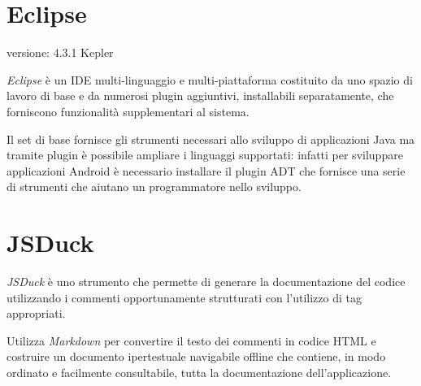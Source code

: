 \section{Eclipse}
\begin{description}
\item[versione: 4.3.1 Kepler]
\end{description}

\emph{Eclipse} è un \ac{IDE} multi-linguaggio e multi-piattaforma costituito da uno spazio di lavoro di base e da numerosi plugin aggiuntivi, installabili separatamente, che forniscono funzionalità supplementari al sistema.

Il set di base fornisce gli strumenti necessari allo sviluppo di applicazioni Java ma tramite plugin è possibile ampliare i linguaggi supportati: infatti per sviluppare applicazioni Android è necessario installare il plugin \ac{ADT} che fornisce una serie di strumenti che aiutano un programmatore nello sviluppo.

\section{JSDuck}
\emph{JSDuck} è uno strumento che permette di generare la documentazione del codice utilizzando i commenti opportunamente strutturati con l'utilizzo di tag appropriati.

Utilizza \emph{Markdown} \cite{daringFireball:markdown} per convertire il testo dei commenti in codice \ac{HTML} e costruire un documento ipertestuale navigabile offline che contiene, in modo ordinato e facilmente consultabile, tutta la documentazione dell'applicazione.